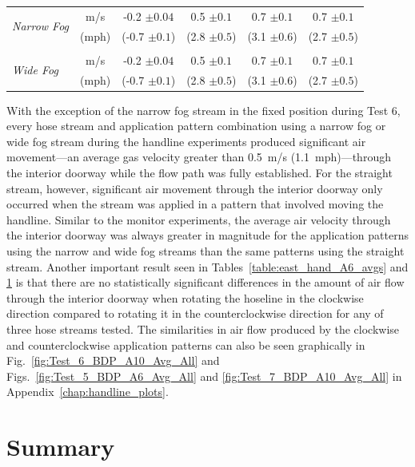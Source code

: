 \documentclass[12pt,oneside]{book}
\begin{document}
\begin{table}[!ht]
\begin{tabular}{lccccc}
\multirow{2}{*}{\textit{Narrow Fog}} & 
\small{m/s}   &  -0.2 $\pm0.04$   &   0.5 $\pm0.1$  &   0.7 $\pm0.1$   &  0.7 $\pm0.1$  \\ & 
\small{(mph)} &  (-0.7 $\pm0.1$)  &  (2.8 $\pm0.5$) &  (3.1 $\pm0.6$)  & (2.7 $\pm0.5$)
\\ \multicolumn{6}{c}{} \\
\multirow{2}{*}{\textit{Wide Fog}} & 
\small{m/s}   &  -0.2 $\pm0.04$   &   0.5 $\pm0.1$  &   0.7 $\pm0.1$   &  0.7 $\pm0.1$  \\ & 
\small{(mph)} &  (-0.7 $\pm0.1$)  &  (2.8 $\pm0.5$) &  (3.1 $\pm0.6$)  & (2.7 $\pm0.5$)
\\ \bottomrule
\end{tabular}
\label{table:west_hand_A10_avgs}
\end{table}
\FloatBarrier

With the exception of the narrow fog stream in the fixed position during Test 6, every hose stream and application pattern combination using a narrow fog or wide fog stream during the handline experiments produced significant air movement---an average gas velocity greater than 0.5~m/s (1.1~mph)---through the interior doorway while the flow path was fully established. For the straight stream, however, significant air movement through the interior doorway only occurred when the stream was applied in a pattern that involved moving the handline. Similar to the monitor experiments, the average air velocity through the interior doorway was always greater in magnitude for the application patterns using the narrow and wide fog streams than the same patterns using the straight stream. Another important result seen in Tables~\ref{table:east_hand_A6_avgs} and \ref{table:west_hand_A10_avgs} is that there are no statistically significant differences in the amount of air flow through the interior doorway when rotating the hoseline in the clockwise direction compared to rotating it in the counterclockwise direction for any of three hose streams tested. The similarities in air flow produced by the clockwise and counterclockwise application patterns can also be seen graphically in Fig.~\ref{fig:Test_6_BDP_A10_Avg_All} and Figs.~\ref{fig:Test_5_BDP_A6_Avg_All} and \ref{fig:Test_7_BDP_A10_Avg_All} in Appendix~\ref{chap:handline_plots}. 


\chapter{Summary}
\label{chap:summary}
\end{document}
